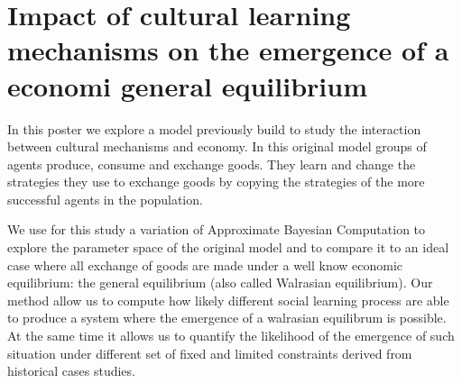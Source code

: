 \documentclass[a4paper,10pt]{report}
\begin{document}
\section*{Impact of cultural learning mechanisms on the emergence of a economi general equilibrium}

In this poster we explore a model previously build to study the interaction between cultural mechanisms and economy. In this original model groups of agents produce, consume and exchange goods. They learn and change the strategies they use to exchange goods by copying the strategies of the more successful agents in the population.

We use for this study a variation of Approximate Bayesian Computation to explore the parameter space of the original model and to compare it to an ideal case where all exchange of goods are made under a well know economic equilibrium: the  general equilibrium (also called Walrasian equilibrium). Our method allow us to compute how likely different social learning process are able to produce a system where the emergence of a walrasian equilibrum is possible. At the same time it allows us to quantify the likelihood of the emergence of such situation under different set of fixed and limited constraints derived from historical cases studies.
\end{document}
